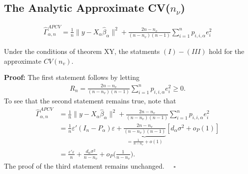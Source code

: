 \documentclass[Research_Module_ES.tex]{subfiles}
\begin{document}
\subsection{The Analytic Approximate CV($n_\nu$)}
\begin{align*}
\hat{\Gamma}_{\alpha,n}^{APCV}=\frac{1}{n}\lVert y-X_\alpha\hat{\beta}_\alpha\rVert^2 + \frac{2n-n_v}{(n-n_v)(n-1)}\sum_{i=1}^np_{i,i,\alpha}e_i^2
\end{align*}

\begin{koro}
Under the conditions of theorem XY, the statments $(I)-(III)$ hold for the approximate $CV(n_v)$.
\end{koro}
\textbf{Proof:} The first statement follows by letting 
\begin{align*}
R_n= \frac{2n-n_v}{(n-n_v)(n-1)}\sum_{i=1}^np_{i,i,\alpha}e_i^2\ge 0.
\end{align*}
To see that the second statement remains true, note that
\begin{align*}
\hat{\Gamma}_{\alpha,n}^{APCV} &= \frac{1}{n}\lVert y-X_\alpha\hat{\beta}_\alpha\rVert^2 +\frac{2n-n_v}{(n-n_v)(n-1)}\sum_{i=1}^np_{i,i,\alpha}e_i^2\\
&=\frac{1}{n} \varepsilon'(I_n-P_\alpha)\varepsilon+ \underbrace{\frac{2n-n_v}{(n-n_v)(n-1)}}_{=\frac{1}{n-n_v}+o(1)}[d_\alpha\sigma^2+o_P(1)]\\
&=\frac{\varepsilon'\varepsilon}{n} + \frac{d_\alpha\sigma^2}{n-n_v}+o_P\biggl(\frac{1}{n-n_v}\biggr).
\end{align*}
The proof of the third statement remains unchanged. $\quad \square$
\end{document}
